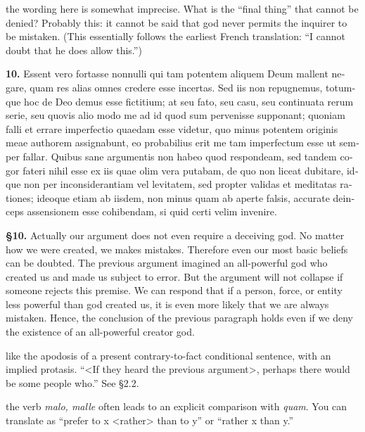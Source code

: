  the wording here is somewhat imprecise. What is the ``final thing'' that cannot be denied? Probably this: it cannot be said that god never permits the inquirer to be mistaken. (This essentially follows the earliest French translation: ``I cannot doubt that he does allow this.'')

\clearpage

\beginnumbering
\pstart
\begin{latin}
    \textenglish{\textbf{10.}} Essent vero fortasse nonnulli qui tam potentem aliquem Deum mallent negare, quam res alias omnes credere esse incertas. Sed iis non repugnemus, totumque hoc de Deo demus esse fictitium; at seu fato, seu casu, seu continuata rerum serie, seu quovis alio modo me ad id quod sum pervenisse supponant; quoniam falli et errare imperfectio quaedam esse videtur, quo minus potentem originis meae authorem assignabunt, eo probabilius erit me tam imperfectum esse ut semper fallar. Quibus sane argumentis non habeo quod respondeam, sed tandem cogor fateri nihil esse ex iis quae olim vera putabam, de quo non liceat dubitare, idque non per inconsiderantiam vel levitatem, sed propter validas et meditatas rationes; ideoque etiam ab iisdem, non minus quam ab aperte falsis, accurate deinceps assensionem esse cohibendam, si quid certi velim invenire.
\end{latin}
\pend
\endnumbering

\prenotes

\textbf{§10.} Actually our argument does not even require a deceiving god. No matter how we were created, we makes mistakes. Therefore even our most basic beliefs can be doubted. The previous argument imagined an all-powerful god who created us and made us subject to error. But the argument will not collapse if someone rejects this premise. We can respond that if a person, force, or entity less powerful than god created us, it is even more likely that we are always mistaken. Hence, the conclusion of the previous paragraph holds even if we deny the existence of an all-powerful creator god.

 like the apodosis of a present contrary-to-fact conditional sentence, with an implied protasis. ``<If they heard the previous argument>, perhaps there would be some people who.'' See §2.2.

 the verb \textit{malo, malle} often leads to an explicit comparison with \textit{quam}. You can translate as ``prefer to x <rather> than to y'' or ``rather x than y.''

